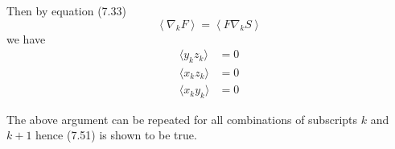 \documentclass[12pt]{article}
\begin{document}
Then by equation (7.33)
\begin{equation*}
\left\langle\nabla_kF\right\rangle=\left\langle F\nabla_kS\right\rangle
\tag{7.33}
\end{equation*}
we have
\begin{align*}
\langle y_kz_k\rangle&=0
\\
\langle x_kz_k\rangle&=0
\\
\langle x_ky_k\rangle&=0
\end{align*}

The above argument can be repeated for all combinations of subscripts $k$ and $k+1$
hence (7.51) is shown to be true.
\end{document}
